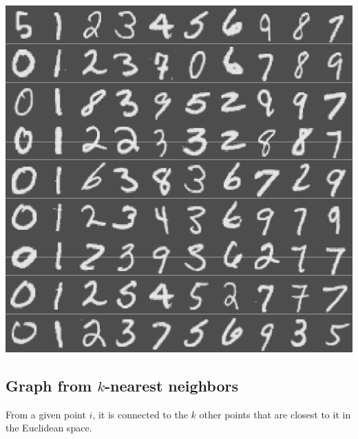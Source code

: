 \documentclass[]{article}
\begin{document}
\includegraphics{gmmase_files/figure-latex/mnistplot-1.pdf}

\subsection{\texorpdfstring{Graph from \(k\)-nearest
neighbors}{Graph from k-nearest neighbors}}\label{graph-from-k-nearest-neighbors}

From a given point \(i\), it is connected to the \(k\) other points that
are closest to it in the Euclidean space.
\end{document}

